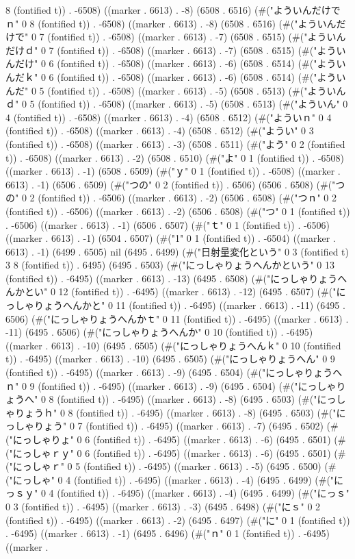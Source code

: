 8 (fontified t)) . -6508) ((marker . 6613) . -8) (6508 . 6516) (#("よういんだけでｎ" 0 8 (fontified t)) . -6508) ((marker . 6613) . -8) (6508 . 6516) (#("よういんだけで" 0 7 (fontified t)) . -6508) ((marker . 6613) . -7) (6508 . 6515) (#("よういんだけｄ" 0 7 (fontified t)) . -6508) ((marker . 6613) . -7) (6508 . 6515) (#("よういんだけ" 0 6 (fontified t)) . -6508) ((marker . 6613) . -6) (6508 . 6514) (#("よういんだｋ" 0 6 (fontified t)) . -6508) ((marker . 6613) . -6) (6508 . 6514) (#("よういんだ" 0 5 (fontified t)) . -6508) ((marker . 6613) . -5) (6508 . 6513) (#("よういんｄ" 0 5 (fontified t)) . -6508) ((marker . 6613) . -5) (6508 . 6513) (#("よういん" 0 4 (fontified t)) . -6508) ((marker . 6613) . -4) (6508 . 6512) (#("よういｎ" 0 4 (fontified t)) . -6508) ((marker . 6613) . -4) (6508 . 6512) (#("ようい" 0 3 (fontified t)) . -6508) ((marker . 6613) . -3) (6508 . 6511) (#("よう" 0 2 (fontified t)) . -6508) ((marker . 6613) . -2) (6508 . 6510) (#("よ" 0 1 (fontified t)) . -6508) ((marker . 6613) . -1) (6508 . 6509) (#("ｙ" 0 1 (fontified t)) . -6508) ((marker . 6613) . -1) (6506 . 6509) (#("つの" 0 2 (fontified t)) . 6506) (6506 . 6508) (#("つの" 0 2 (fontified t)) . -6506) ((marker . 6613) . -2) (6506 . 6508) (#("つｎ" 0 2 (fontified t)) . -6506) ((marker . 6613) . -2) (6506 . 6508) (#("つ" 0 1 (fontified t)) . -6506) ((marker . 6613) . -1) (6506 . 6507) (#("ｔ" 0 1 (fontified t)) . -6506) ((marker . 6613) . -1) (6504 . 6507) (#("1" 0 1 (fontified t)) . -6504) ((marker . 6613) . -1) (6499 . 6505) nil (6495 . 6499) (#("日射量変化という" 0 3 (fontified t) 3 8 (fontified t)) . 6495) (6495 . 6503) (#("にっしゃりょうへんかという" 0 13 (fontified t)) . -6495) ((marker . 6613) . -13) (6495 . 6508) (#("にっしゃりょうへんかとい" 0 12 (fontified t)) . -6495) ((marker . 6613) . -12) (6495 . 6507) (#("にっしゃりょうへんかと" 0 11 (fontified t)) . -6495) ((marker . 6613) . -11) (6495 . 6506) (#("にっしゃりょうへんかｔ" 0 11 (fontified t)) . -6495) ((marker . 6613) . -11) (6495 . 6506) (#("にっしゃりょうへんか" 0 10 (fontified t)) . -6495) ((marker . 6613) . -10) (6495 . 6505) (#("にっしゃりょうへんｋ" 0 10 (fontified t)) . -6495) ((marker . 6613) . -10) (6495 . 6505) (#("にっしゃりょうへん" 0 9 (fontified t)) . -6495) ((marker . 6613) . -9) (6495 . 6504) (#("にっしゃりょうへｎ" 0 9 (fontified t)) . -6495) ((marker . 6613) . -9) (6495 . 6504) (#("にっしゃりょうへ" 0 8 (fontified t)) . -6495) ((marker . 6613) . -8) (6495 . 6503) (#("にっしゃりょうｈ" 0 8 (fontified t)) . -6495) ((marker . 6613) . -8) (6495 . 6503) (#("にっしゃりょう" 0 7 (fontified t)) . -6495) ((marker . 6613) . -7) (6495 . 6502) (#("にっしゃりょ" 0 6 (fontified t)) . -6495) ((marker . 6613) . -6) (6495 . 6501) (#("にっしゃｒｙ" 0 6 (fontified t)) . -6495) ((marker . 6613) . -6) (6495 . 6501) (#("にっしゃｒ" 0 5 (fontified t)) . -6495) ((marker . 6613) . -5) (6495 . 6500) (#("にっしゃ" 0 4 (fontified t)) . -6495) ((marker . 6613) . -4) (6495 . 6499) (#("にっｓｙ" 0 4 (fontified t)) . -6495) ((marker . 6613) . -4) (6495 . 6499) (#("にっｓ" 0 3 (fontified t)) . -6495) ((marker . 6613) . -3) (6495 . 6498) (#("にｓ" 0 2 (fontified t)) . -6495) ((marker . 6613) . -2) (6495 . 6497) (#("に" 0 1 (fontified t)) . -6495) ((marker . 6613) . -1) (6495 . 6496) (#("ｎ" 0 1 (fontified t)) . -6495) ((marker . 